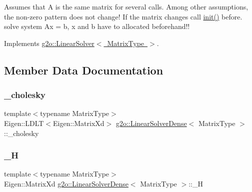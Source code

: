 Assumes that A is the same matrix for several calls. Among other assumptions, the non-\/zero pattern does not change! If the matrix changes call \mbox{\hyperlink{classg2o_1_1_linear_solver_dense_a24f68ecd4b022269dbfc4d990eb5c57b}{init()}} before. solve system Ax = b, x and b have to allocated beforehand!! 

Implements \mbox{\hyperlink{classg2o_1_1_linear_solver_aa44b40826d50203c8ce2ff258c34e030}{g2o\+::\+Linear\+Solver$<$ Matrix\+Type $>$}}.



\subsection{Member Data Documentation}
\mbox{\label{classg2o_1_1_linear_solver_dense_a20fc35e2f25107a6e36211861034aae0}} 
\subsubsection{\texorpdfstring{\+\_\+cholesky}{\_cholesky}}
{\footnotesize\ttfamily template$<$typename Matrix\+Type$>$ \\
Eigen\+::\+L\+D\+LT$<$Eigen\+::\+Matrix\+Xd$>$ \mbox{\hyperlink{classg2o_1_1_linear_solver_dense}{g2o\+::\+Linear\+Solver\+Dense}}$<$ Matrix\+Type $>$\+::\+\_\+cholesky\hspace{0.3cm}{\ttfamily [protected]}}

\mbox{\label{classg2o_1_1_linear_solver_dense_a5ca6a1f2358ce0620dbdbae3fdc9fc99}} 
\subsubsection{\texorpdfstring{\+\_\+H}{\_H}}
{\footnotesize\ttfamily template$<$typename Matrix\+Type$>$ \\
Eigen\+::\+Matrix\+Xd \mbox{\hyperlink{classg2o_1_1_linear_solver_dense}{g2o\+::\+Linear\+Solver\+Dense}}$<$ Matrix\+Type $>$\+::\+\_\+H\hspace{0.3cm}{\ttfamily [protected]}}

